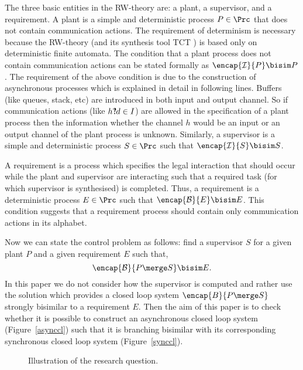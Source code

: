 \documentclass[a4paper,english,final]{article}
\theoremstyle{plain}
\theoremstyle{definition}
\newcommand{\com}{\ensuremath{?\mkern-6mu!}}
\newcommand{\hide}{\ensuremath{\mathcal{I}}}
\newcommand{\block}{\ensuremath{\mathcal{B}}}
\begin{document}
The three basic entities in the RW-theory are: a plant, a supervisor, and a requirement. A plant is a simple and deterministic process $P\in\Prc$ that does not contain communication actions. The requirement of determinism is necessary because the RW-theory (and its synthesis tool TCT \citep{W:2008}) is based only on deterministic finite automata. The condition that a plant process does not contain communication actions can be stated formally as $\encap{\hide}{P}\bisim P$. The requirement of the above condition is due to the construction of asynchronous processes which is explained in detail in following lines. Buffers (like queues, stack, etc) are introduced in both input and output channel. So if communication actions (like $h\com d\in I$) are allowed in the specification of a plant process then the information whether the channel $h$ would be an input or an output channel of the plant process is unknown. Similarly, a supervisor is a simple and deterministic process $S\in\Prc$ such that $\encap{\hide}{S}\bisim S$.

A requirement is a process which specifies the legal interaction that should occur while the plant and supervisor are interacting such that a required task (for which supervisor is synthesised) is completed. Thus, a requirement is a deterministic process $E\in\Prc$ such that $\encap{\block}{E}\bisim E$. This condition suggests that a requirement process should contain only communication actions in its alphabet.

Now we can state the control problem as follows: find a supervisor $S$ for a given plant $P$ and a given requirement $E$ such that, \[\encap{\block}{P\merge S}\bisim E.\] In this paper we do not consider how the supervisor is computed and rather use the solution \citep{W:2008} which provides a closed loop system $\encap{B}{P\merge S}$ strongly bisimilar to a requirement $E$. Then the aim of this paper is to check whether it is possible to construct an asynchronous closed loop system (Figure~\ref{asynccl}) such that it is branching bisimilar with its corresponding synchronous closed loop system (Figure~\ref{synccl}).

\begin{figure}\centering
{}
\caption{Illustration of the research question.}\label{cm}
\end{figure}
\end{document}
